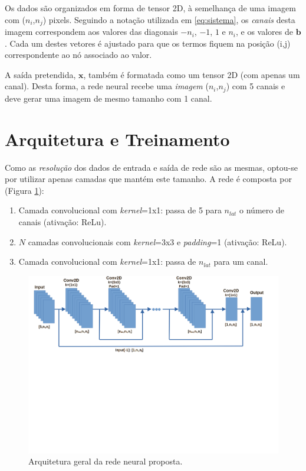 \documentclass[final,5p]{elsarticle}
\numberwithin{equation}{section}
\begin{document}
    Os dados são organizados em forma de tensor 2D, à semelhança de uma imagem com ($n_i$,$n_j$) pixels. Seguindo a notação utilizada em \ref{eq:sistema}, os \emph{canais} desta imagem correspondem aos valores das diagonais $-n_i$, $-1$, $1$ e $n_i$, e os valores de $\textbf{b}$. Cada um destes vetores é ajustado para que os termos fiquem na posição (i,j) correspondente ao nó associado ao valor.

    A saída pretendida, $\textbf{x}$, também é formatada como um tensor 2D (com apenas um canal). Desta forma, a rede neural recebe uma \emph{imagem} ($n_i$,$n_j$) com 5 canais e deve gerar uma imagem de mesmo tamanho com 1 canal.

\section{Arquitetura e Treinamento}

    Como as \emph{resolução} dos dados de entrada e saída de rede são as mesmas, optou-se por utilizar apenas camadas que mantém este tamanho. A rede é composta por (Figura \ref{fig:arquitetura}):

    \begin{enumerate}
        \item Camada convolucional com \emph{kernel}=1x1: passa de 5 para $n_{lat}$ o número de canais (ativação: ReLu).
        \item $N$ camadas convolucionais com \emph{kernel}=3x3 e \emph{padding}=1 (ativação: ReLu).
        \item Camada convolucional com \emph{kernel}=1x1: passa de $n_{lat}$ para um canal.
    \end{enumerate}

    \begin{figure}[hbt!]
        \centering
        \includegraphics[width=0.95\columnwidth, trim={0cm 7.8cm 1cm 0cm}, clip]{./fig/NN.png}
        \caption{Arquitetura geral da rede neural proposta.}\label{fig:arquitetura}
    \end{figure}
\end{document}
